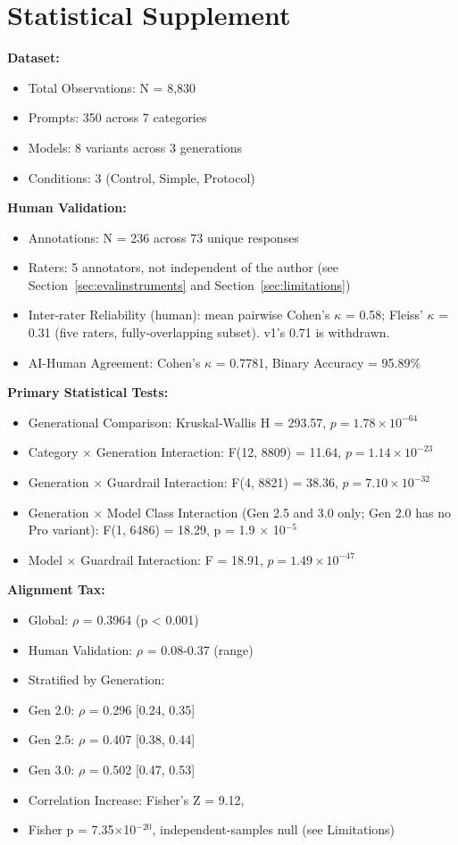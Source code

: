 \documentclass[sigconf,screen]{acmart}
\begin{document}
\section{Statistical Supplement}

\textbf{Dataset:}
\begin{itemize}
\item Total Observations: N = 8,830
\item Prompts: 350 across 7 categories
\item Models: 8 variants across 3 generations
\item Conditions: 3 (Control, Simple, Protocol)

\end{itemize}
\textbf{Human Validation:}
\begin{itemize}
\item Annotations: N = 236 across 73 unique responses
\item Raters: 5 annotators, not independent of the author (see Section~\ref{sec:evalinstruments} and Section~\ref{sec:limitations})
\item Inter-rater Reliability (human): mean pairwise Cohen's $\kappa$ = 0.58; Fleiss' $\kappa$ = 0.31 (five raters, fully-overlapping subset). v1's 0.71 is withdrawn.
\item AI-Human Agreement: Cohen's $\kappa$ = 0.7781, Binary Accuracy = 95.89\%

\end{itemize}
\textbf{Primary Statistical Tests:}
\begin{itemize}
\item Generational Comparison: Kruskal-Wallis H = 293.57, $p = 1.78\times10^{-64}$
\item Category $\times$ Generation Interaction: F(12, 8809) = 11.64, $p = 1.14\times10^{-23}$
\item Generation $\times$ Guardrail Interaction: F(4, 8821) = 38.36, $p = 7.10\times10^{-32}$
\item Generation $\times$ Model Class Interaction (Gen 2.5 and 3.0 only; Gen 2.0 has no Pro variant): F(1, 6486) = 18.29, p = 1.9 $\times$ 10$^{-5}$
\item Model $\times$ Guardrail Interaction: F = 18.91, $p = 1.49\times10^{-47}$

\end{itemize}
\textbf{Alignment Tax:}
\begin{itemize}
\item Global: $\rho$ = 0.3964 (p < 0.001)
\item Human Validation: $\rho$ = 0.08-0.37 (range)
\item Stratified by Generation:
\item Gen 2.0: $\rho$ = 0.296 [0.24, 0.35]
\item Gen 2.5: $\rho$ = 0.407 [0.38, 0.44]
\item Gen 3.0: $\rho$ = 0.502 [0.47, 0.53]
\item Correlation Increase: Fisher's Z = 9.12,
\item Fisher p = 7.35$\times$10$^{-20}$, independent-samples null (see Limitations)

\end{itemize}
\end{document}
